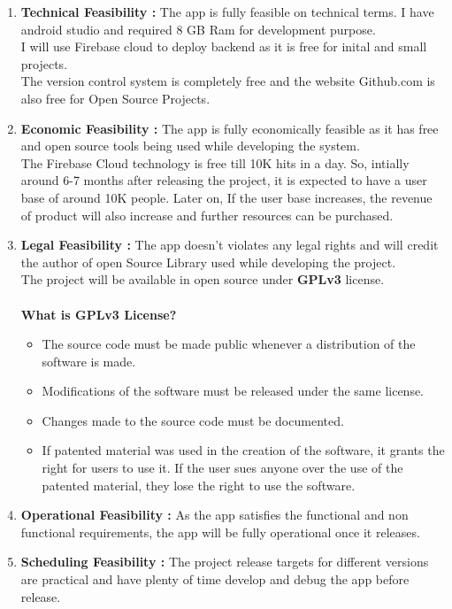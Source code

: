 \begin{enumerate}
	\item \textbf{Technical Feasibility :} The app is fully feasible on technical terms. I have android studio and required 8 GB Ram for development purpose.\\
	I will use Firebase cloud to deploy backend as it is free for inital and small projects.\\
	The version control system is completely free and the website Github.com is also free for Open Source Projects.
   \item \textbf{Economic Feasibility :} The app is fully economically feasible as it has free and open source tools being used while developing the system.\\
   The Firebase Cloud technology is free till 10K hits in a day. So, intially around 6-7 months after releasing the project, it is expected to have a user base of around 10K people. Later on, If the user base increases, the revenue of product will also increase and further resources can be purchased.
   \item \textbf{Legal Feasibility :} The app doesn't violates any legal rights and will credit the author of open Source Library used while developing the project.\\
   The project will be available in open source under \textbf{GPLv3} license.\\
   \\
   \textbf{What is GPLv3 License?}
   \begin{itemize}
   	\item The source code must be made public whenever a distribution of the software is made.
   	\item Modifications of the software must be released under the same license.
   	\item Changes made to the source code must be documented.
   	\item If patented material was used in the creation of the software, it grants the right for users to use it. If the user sues anyone over the use of the patented material, they lose the right to use the software.\\
   \end{itemize}
 
   \item \textbf{Operational Feasibility : } As the app satisfies the functional and non functional requirements, the app will be fully operational once it releases.
   
   \item \textbf{Scheduling Feasibility : } The project release targets for different versions are practical and have plenty of time develop and debug the app before release.
\end{enumerate}

